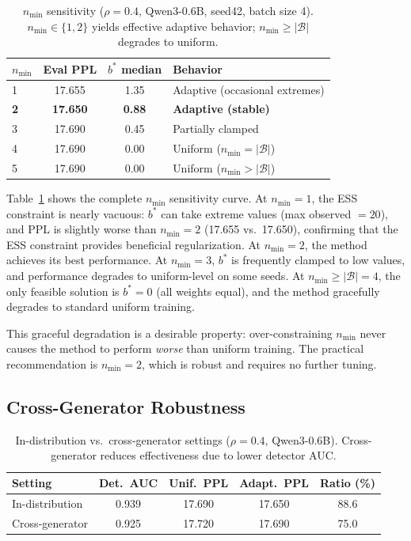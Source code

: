 \documentclass[11pt,a4paper]{article}
\newcommand{\bstar}{b^{*}}
\newcommand{\nmin}{n_{\min}}
\begin{document}
\begin{table}[t]
\centering
\small
\caption{$\nmin$ sensitivity ($\rho{=}0.4$, Qwen3-0.6B, seed42, batch size 4). $\nmin \in \{1, 2\}$ yields effective adaptive behavior; $\nmin \geq |\mathcal{B}|$ degrades to uniform.}
\label{tab:nmin}
\begin{tabular}{lccl}
\toprule
$\nmin$ & Eval PPL & $\bstar$ median & Behavior \\
\midrule
1 & 17.655 & 1.35 & Adaptive (occasional extremes) \\
\textbf{2} & \textbf{17.650} & \textbf{0.88} & \textbf{Adaptive (stable)} \\
3 & 17.690 & 0.45 & Partially clamped \\
4 & 17.690 & 0.00 & Uniform ($\nmin = |\mathcal{B}|$) \\
5 & 17.690 & 0.00 & Uniform ($\nmin > |\mathcal{B}|$) \\
\bottomrule
\end{tabular}
\end{table}

Table~\ref{tab:nmin} shows the complete $\nmin$ sensitivity curve.
At $\nmin{=}1$, the ESS constraint is nearly vacuous: $\bstar$ can take extreme values (max observed $= 20$), and PPL is slightly worse than $\nmin{=}2$ (17.655 vs.\ 17.650), confirming that the ESS constraint provides beneficial regularization.
At $\nmin{=}2$, the method achieves its best performance.
At $\nmin{=}3$, $\bstar$ is frequently clamped to low values, and performance degrades to uniform-level on some seeds.
At $\nmin \geq |\mathcal{B}| = 4$, the only feasible solution is $\bstar{=}0$ (all weights equal), and the method gracefully degrades to standard uniform training.

This graceful degradation is a desirable property: over-constraining $\nmin$ never causes the method to perform \emph{worse} than uniform training.
The practical recommendation is $\nmin = 2$, which is robust and requires no further tuning.

\subsection{Cross-Generator Robustness}
\label{sec:cross_gen}

\begin{table}[t]
\centering
\small
\caption{In-distribution vs.\ cross-generator settings ($\rho{=}0.4$, Qwen3-0.6B). Cross-generator reduces effectiveness due to lower detector AUC.}
\label{tab:cross_gen}
\begin{tabular}{lcccc}
\toprule
Setting & Det.\ AUC & Unif.\ PPL & Adapt.\ PPL & Ratio (\%) \\
\midrule
In-distribution & 0.939 & 17.690 & 17.650 & 88.6 \\
Cross-generator & 0.925 & 17.720 & 17.690 & 75.0 \\
\bottomrule
\end{tabular}
\end{table}
\end{document}
